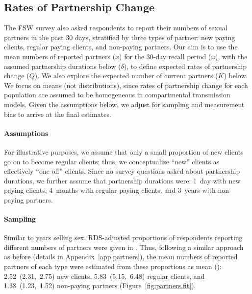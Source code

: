 \subsection{Rates of Partnership Change}\label{meth.partners}
The FSW survey \cite{Baral2014} also asked respondents to report
their numbers of sexual partners in the past 30 days,
stratified by three types of partner:
new paying clients, regular paying clients, and non-paying partners.
Our aim is to use the mean numbers of reported partners ($x$)
for the 30-day recall period ($\omega$),
with the assumed partnership durations below ($\delta$),
to define expected rates of partnership change ($Q$).
We also explore the expected number of current partners ($K$) below.
We focus on means (not distributions), since
rates of partnership change for each population are assumed to be
homogeneous in compartmental transmission models.
Given the assumptions below, we adjust for sampling and measurement bias
to arrive at the final estimates.
\paragraph{Assumptions}
For illustrative purposes, we assume that
only a small proportion of new clients go on to become regular clients;
thus, we conceptualize ``new'' clients as effectively ``one-off'' clients.
Since no survey questions asked about partnership durations,
we further assume that partnership durations were:
1~day with new paying clients,
4~months with regular paying clients, and
3~years with non-paying partners.
\paragraph{Sampling}
Similar to years selling sex,
RDS-adjusted proportions of respondents reporting different numbers of partners
were given in \cite{Baral2014}.
Thus, following a similar approach as before (details in Appendix~\ref{app.partners}),
the mean numbers of reported partners of each type
were estimated from these proportions as mean (\ci):
2.52~(2.31,~2.75) new clients,
5.83~(5.15,~6.48) regular clients, and
1.38~(1.23,~1.52) non-paying partners
(Figure~\ref{fig:partners.fit}).
